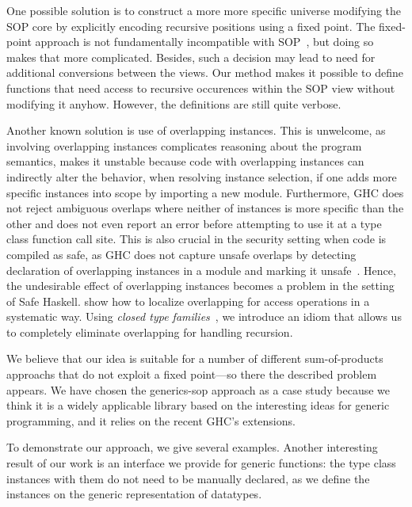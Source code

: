 \documentclass[sigplan,review,anonymous]{acmart}\settopmatter{printfolios=true,printccs=false,printacmref=false}
\begin{document}
One possible solution is to construct a more more specific universe modifying the SOP core by explicitly encoding recursive positions using a fixed point. The fixed-point approach is not fundamentally incompatible with SOP~\citep{VriLoeh2014}, but doing so makes that more complicated. Besides, such a decision may lead to need for additional conversions between the views. Our method makes it possible to define functions that need access to recursive occurences within the SOP view without modifying it anyhow. However, the definitions are still quite verbose.

Another known solution is use of overlapping instances. This is unwelcome, as involving overlapping instances complicates reasoning about the program semantics, makes it unstable because code with overlapping instances can indirectly alter the behavior, when resolving instance selection, if one adds more specific instances into scope by importing a new module. Furthermore, GHC does not reject ambiguous overlaps where neither of instances is more specific than the other and does not even report an error before attempting to use it at a type class function call site. This is also crucial in the security setting when code is compiled as safe, as GHC does not capture unsafe overlaps by detecting declaration of overlapping instances in a module and marking it unsafe~\citep{sh-overlapping}. Hence, the undesirable effect of overlapping instances becomes a problem in the setting of Safe Haskell. \citet{Kiselyov2004} show how to localize overlapping for access operations in a systematic way. Using \textit{closed type families}~\citep{Eisenberg2014}, we introduce an idiom that allows us to completely eliminate overlapping for handling recursion.

We believe that our idea is suitable for a number of different sum-of-products approachs that do not exploit a fixed point---so there the described problem appears. We have chosen the \textsf{generics-sop} approach as a case study because we think it is a widely applicable library based on the interesting ideas for generic programming, and it relies on the recent GHC's extensions.

To demonstrate our approach, we give several examples. Another interesting result of our work is an interface we provide for generic functions: the type class instances with them do not need to be manually declared, as we define the instances on the generic representation of datatypes.
\end{document}
